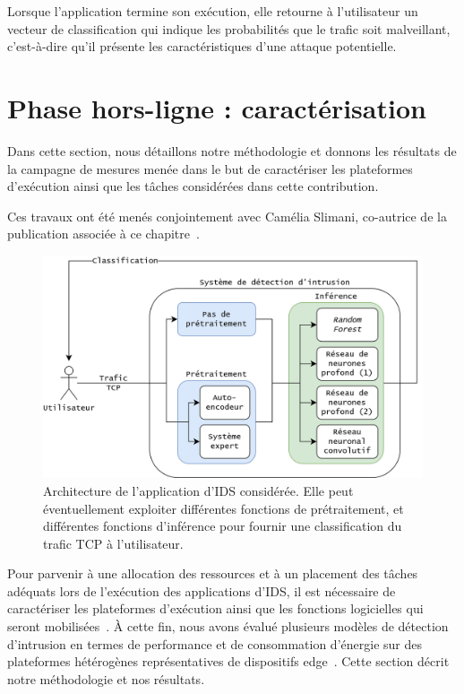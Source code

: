 Lorsque l'application termine son exécution, elle retourne à l'utilisateur un vecteur de classification qui indique les probabilités que le trafic soit malveillant, c'est-à-dire qu'il présente les caractéristiques d'une attaque potentielle.

\section{Phase hors-ligne : caractérisation} 
\label{section:herocache-workload}

Dans cette section, nous détaillons notre méthodologie et donnons les résultats de la campagne de mesures menée dans le but de caractériser les plateformes d'exécution ainsi que les tâches considérées dans cette contribution.

Ces travaux ont été menés conjointement avec Camélia Slimani, co-autrice de la publication associée à ce chapitre~\cite{herocache}.

\begin{figure}[!ht]
    \centering
    \includegraphics[width=0.8\columnwidth]{5_Chapitre5/figures/ids-application.png}
    \caption{Architecture de l'application d'\gls{IDS} considérée. Elle peut éventuellement exploiter différentes fonctions de prétraitement, et différentes fonctions d'inférence pour fournir une classification du trafic \gls{TCP} à l'utilisateur.}
    \label{figure:herocache-ids-application}
\end{figure}

Pour parvenir à une allocation des ressources et à un placement des tâches adéquats lors de l'exécution des applications d'\gls{IDS}, il est nécessaire de caractériser les plateformes d'exécution ainsi que les fonctions logicielles qui seront mobilisées~\cite{mampageHolisticViewResource2022}. À cette fin, nous avons évalué plusieurs modèles de détection d'intrusion en termes de performance et de consommation d'énergie sur des plateformes hétérogènes représentatives de dispositifs edge~\cite{kljucaric2020}. Cette section décrit notre méthodologie et nos résultats.

